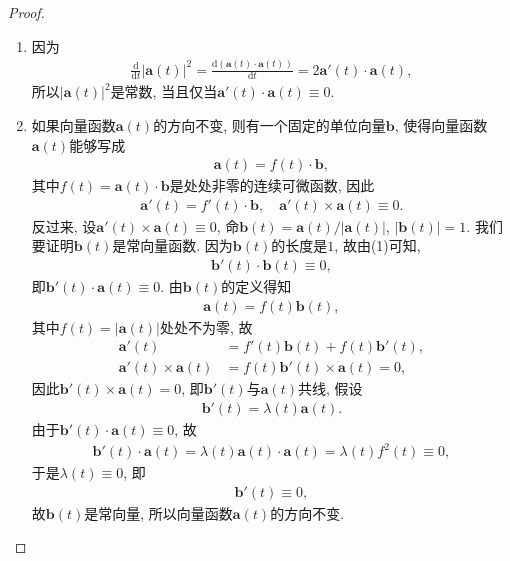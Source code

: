 \documentclass[../../main.tex]{subfiles}%
\begin{document}
\begin{proof}
\begin{enumerate}[(1)]
\item 因为
\begin{align*}
\frac{\mathrm{d}}{\mathrm{d}t}|\bm{a}(t)|^2 = \frac{\mathrm{d}(\bm{a}(t)\cdot\bm{a}(t))}{\mathrm{d}t} = 2\bm{a}'(t)\cdot\bm{a}(t),
\end{align*}
所以$|\bm{a}(t)|^2$是常数, 当且仅当$\bm{a}'(t)\cdot\bm{a}(t)\equiv 0$.

\item 如果向量函数$\bm{a}(t)$的方向不变, 则有一个固定的单位向量$\bm{b}$, 使得向量函数$\bm{a}(t)$能够写成
\begin{align*}
\bm{a}(t) = f(t)\cdot\bm{b},
\end{align*}
其中$f(t) = \bm{a}(t)\cdot\bm{b}$是处处非零的连续可微函数, 因此
\begin{align*}
\bm{a}'(t) = f'(t)\cdot\bm{b},\quad \bm{a}'(t)\times\bm{a}(t)\equiv 0.
\end{align*}
反过来, 设$\bm{a}'(t)\times\bm{a}(t)\equiv 0$, 命$\bm{b}(t) = \bm{a}(t)/|\bm{a}(t)|$, $|\bm{b}(t)|=1$. 我们要证明$\bm{b}(t)$是常向量函数. 因为$\bm{b}(t)$的长度是$1$, 故由(1)可知,
\begin{align*}
\bm{b}'(t)\cdot\bm{b}(t)\equiv 0,
\end{align*}
即$\bm{b}'(t)\cdot\bm{a}(t)\equiv 0$. 由$\bm{b}(t)$的定义得知
\begin{align*}
\bm{a}(t) = f(t)\bm{b}(t),
\end{align*}
其中$f(t)=|\bm{a}(t)|$处处不为零, 故
\begin{align*}
\bm{a}'(t) &= f'(t)\bm{b}(t) + f(t)\bm{b}'(t), \\
\bm{a}'(t)\times\bm{a}(t) &= f(t)\bm{b}'(t)\times\bm{a}(t) = 0,
\end{align*}
因此$\bm{b}'(t)\times\bm{a}(t)=0$, 即$\bm{b}'(t)$与$\bm{a}(t)$共线, 假设
\begin{align*}
\bm{b}'(t) = \lambda(t)\bm{a}(t).
\end{align*}
由于$\bm{b}'(t)\cdot\bm{a}(t)\equiv 0$, 故
\begin{align*}
\bm{b}'(t)\cdot\bm{a}(t) = \lambda(t)\bm{a}(t)\cdot\bm{a}(t) = \lambda(t)f^2(t)\equiv 0,
\end{align*}
于是$\lambda(t)\equiv 0$, 即
\begin{align*}
\bm{b}'(t)\equiv 0,
\end{align*}
故$\bm{b}(t)$是常向量, 所以向量函数$\bm{a}(t)$的方向不变.


\end{enumerate}
\end{proof}
\end{document}
